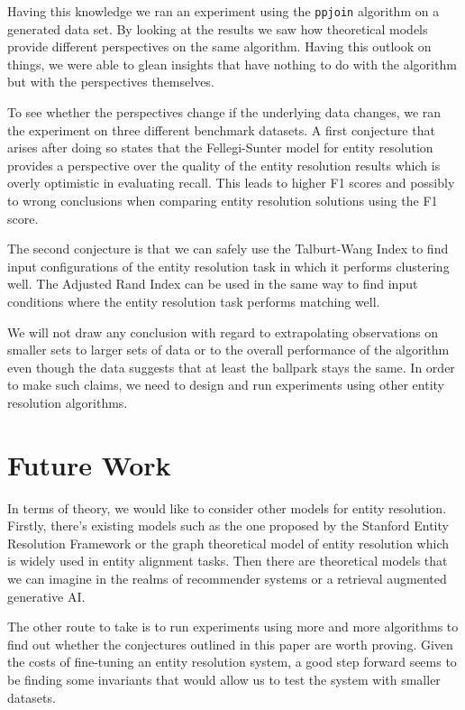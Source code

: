 \documentclass[lettersize,journal]{IEEEtran}
\begin{document}
    Having this knowledge we ran an experiment using the \texttt{ppjoin}
    algorithm on a generated data set.
    By looking at the results we saw how theoretical models provide different
    perspectives on the same algorithm.
    Having this outlook on things, we were able to glean insights that have
    nothing to do with the algorithm but with the perspectives themselves.

    To see whether the perspectives change if the underlying data changes, we
    ran the experiment on three different benchmark datasets.
    A first conjecture that arises after doing so states that the Fellegi-Sunter
    model for entity resolution provides a perspective over the quality of the
    entity resolution results which is overly optimistic in evaluating recall.
    This leads to higher F1 scores and possibly to wrong conclusions when
    comparing entity resolution solutions using the F1 score.

    The second conjecture is that we can safely use the Talburt-Wang Index to
    find input configurations of the entity resolution task in which it performs
    clustering well.
    The Adjusted Rand Index can be used in the same way to find input conditions
    where the entity resolution task performs matching well.

    We will not draw any conclusion with regard to extrapolating observations on
    smaller sets to larger sets of data or to the overall performance of the
    algorithm even though the data suggests that at least the ballpark stays the
    same.
    In order to make such claims, we need to design and run experiments using
    other entity resolution algorithms.

    \section[future]{Future Work}\label{sec:future}

    In terms of theory, we would like to consider other models for entity
    resolution.
    Firstly, there's existing models such as the one proposed by the Stanford
    Entity Resolution Framework\cite{Ben2009Swoosh} or the graph theoretical
    model of entity resolution which is widely used in entity alignment tasks.
    Then there are theoretical models that we can imagine in the realms of
    recommender systems or a retrieval augmented generative AI.

    The other route to take is to run experiments using more and more algorithms
    to find out whether the conjectures outlined in this paper are worth proving.
    Given the costs of fine-tuning an entity resolution system, a good step
    forward seems to be finding some invariants that would allow us to test
    the system with smaller datasets.
\end{document}
